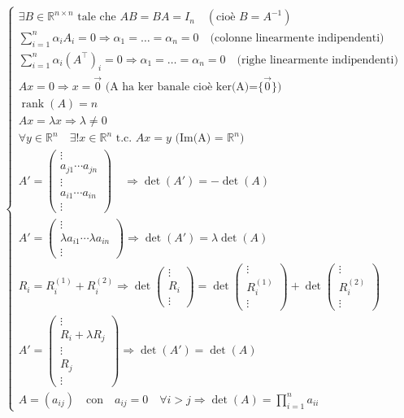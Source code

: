 \documentclass[12pt,a4paper]{article}
\begin{document}
\[
\begin{cases}
    \exists B \in \mathbb{R}^{n \times n} \text{ tale che } AB = BA = I_n \quad (\text{cioè } B = A^{-1}) \\
    \sum_{i=1}^n \alpha_i A_i = 0 \Rightarrow \alpha_1 = \dots = \alpha_n = 0 \quad \text{(colonne linearmente indipendenti)}
 \\
     \sum_{i=1}^n \alpha_i (A^\top)_i = 0 \Rightarrow \alpha_1 = \dots = \alpha_n = 0 \quad \text{(righe linearmente indipendenti)}
 \\
    Ax = 0 \Rightarrow x = \vec{0} \text{ (A ha ker banale cioè ker(A)}\textbf{=}\text{\{$\vec{0}$\})}\\
    \operatorname{rank}(A) = n \\
    Ax = \lambda x \Rightarrow \lambda \ne 0 \\
    \forall y \in \mathbb{R}^n \quad \exists ! x \in \mathbb{R}^n \text{ t.c. } Ax = y \text{ (Im(A)}\textbf{ = }\text{$\mathbb{R}^n)$}\\

A' = 
\begin{pmatrix}
\vdots \\
a_{j1} \cdots a_{jn} \\
\vdots \\
a_{i1} \cdots a_{in} \\
\vdots
\end{pmatrix}
\quad
\Rightarrow
\det(A') = -\det(A)\\

A' = 
\begin{pmatrix}
\vdots \\
\lambda a_{i1} \cdots \lambda a_{in} \\
\vdots
\end{pmatrix}

\Rightarrow
\det(A') = \lambda \det(A)
\\R_i = R_i^{(1)} + R_i^{(2)}
\Rightarrow
\det\begin{pmatrix}
\vdots \\
R_i \\
\vdots
\end{pmatrix}
=
\det\begin{pmatrix}
\vdots \\
R_i^{(1)} \\
\vdots
\end{pmatrix}
+
\det\begin{pmatrix}
\vdots \\
R_i^{(2)} \\
\vdots
\end{pmatrix}\\
A' = 
\begin{pmatrix}
\vdots \\
R_i + \lambda R_j \\
\vdots \\
R_j \\
\vdots
\end{pmatrix}
\Rightarrow
\det(A') = \det(A)\\
A = (a_{ij}) \quad \text{con} \quad a_{ij} = 0 \quad \forall i > j
\Rightarrow
\det(A) = \prod_{i=1}^n a_{ii}
\end{cases}
\]
\end{document}
